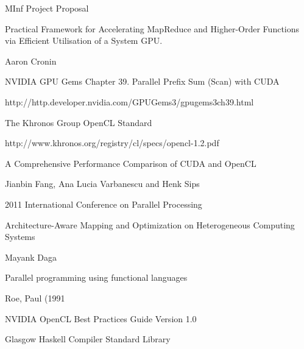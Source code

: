 \documentclass[11pt,a4paper,twocolumn] {scrartcl}   %
\begin{document}
\maketitle
{}

\pagebreak{}

%
%





\pagebreak

\begin{thebibliography}{9}

\thispagestyle{empty}
\pagestyle{empty}
    MInf Project Proposal

    Practical Framework for Accelerating MapReduce and Higher-Order Functions via Efficient Utilisation of a System GPU.

    Aaron Cronin

    NVIDIA GPU Gems
    Chapter 39. Parallel Prefix Sum (Scan) with CUDA

    http://http.developer.nvidia.com/GPUGems3/gpugems\textunderscore3ch39.html

    The Khronos Group OpenCL Standard

    http://www.khronos.org/registry/cl/specs/opencl-1.2.pdf

    A Comprehensive Performance Comparison of
    CUDA and OpenCL

    Jianbin Fang, Ana Lucia Varbanescu and Henk Sips

    2011 International Conference on Parallel Processing

    Architecture-Aware Mapping and Optimization on Heterogeneous Computing Systems

    Mayank Daga

    Parallel programming using functional languages

    Roe, Paul (1991

    NVIDIA OpenCL Best Practices Guide Version 1.0

    Glasgow Haskell Compiler Standard Library


\end{thebibliography}
\end{document}
